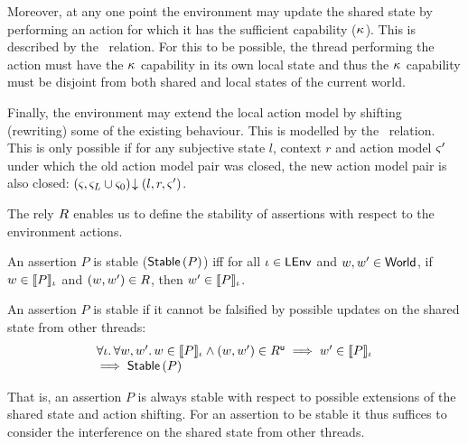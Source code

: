 Moreover, at any one point the environment may update the shared state by performing an action for which it has the sufficient capability ($\ca{}$). This is described by the \updateR\ relation. For this to be possible, the thread performing the action must have the $\ca{}$ capability in its own local state and thus the $\ca{}$ capability must be disjoint from both shared and local states of the current world. 

Finally, the environment may extend the local action model by shifting (rewriting) some of the existing behaviour. This is modelled by the \shiftR\ relation. This is only possible if for any subjective state $l$, context $r$ and action model $\amod{}'$ under which the old action model pair was closed, the new action model pair is also closed: $\extendsAM{\amod{}, \amod{L} \cup \amod{0}}{l}{r}{\amod{}'}$. 

The rely $\rely$ enables us to define the stability of assertions with respect to the environment actions.
%
\begin{definition}[Stability] An assertion $P$ is stable ($\stable{P}$) iff for all $\lenv \in \LEnv$ and $w, w' \in \Worlds$, if $w \in \sem[\lenv]{P}$ and $(w, w') \in \rely$, then $w' \in \sem[\lenv]{P}$.
\end{definition}
%
\begin{lemma}[Stability]
An assertion $P$ is stable if it cannot be falsified by possible updates on the shared state from other threads:
%
\[
\begin{array}{l}
	\for{\lenv}\for{w, w'} 
     w \in \sem[\lenv]{P} \land (w, w') \in \updateR \implies
	 w' \in \sem[\lenv]{P}\\
	 
	 \implies \stable{P}
\end{array}	 
\]
%
\end{lemma}
%
That is, an assertion $P$ is always stable with respect to possible extensions of the shared state and action shifting. For an assertion to be stable it thus suffices to consider the interference on the shared state from other threads.

